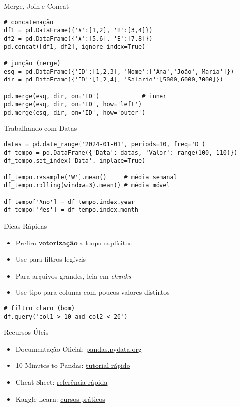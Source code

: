 \documentclass[aspectratio=169]{beamer}
\let\texttt\textttblue
\begin{document}
\begin{frame}[fragile]{Merge, Join e Concat}
\begin{lstlisting}
# concatenação
df1 = pd.DataFrame({'A':[1,2], 'B':[3,4]})
df2 = pd.DataFrame({'A':[5,6], 'B':[7,8]})
pd.concat([df1, df2], ignore_index=True)

# junção (merge)
esq = pd.DataFrame({'ID':[1,2,3], 'Nome':['Ana','João','Maria']})
dir = pd.DataFrame({'ID':[1,2,4], 'Salario':[5000,6000,7000]})

pd.merge(esq, dir, on='ID')            # inner
pd.merge(esq, dir, on='ID', how='left')
pd.merge(esq, dir, on='ID', how='outer')
\end{lstlisting}
\end{frame}

\begin{frame}[fragile]{Trabalhando com Datas}
\begin{lstlisting}
datas = pd.date_range('2024-01-01', periods=10, freq='D')
df_tempo = pd.DataFrame({'Data': datas, 'Valor': range(100, 110)})
df_tempo.set_index('Data', inplace=True)

df_tempo.resample('W').mean()     # média semanal
df_tempo.rolling(window=3).mean() # média móvel

df_tempo['Ano'] = df_tempo.index.year
df_tempo['Mes'] = df_tempo.index.month
\end{lstlisting}
\end{frame}

\begin{frame}[fragile]{Dicas Rápidas}
  \begin{itemize}
    \item Prefira \textbf{vetorização} a loops explícitos
    \item Use \texttt{query()} para filtros legíveis
    \item Para arquivos grandes, leia em \textit{chunks}
    \item Use tipo \texttt{category} para colunas com poucos valores distintos
  \end{itemize}
\vspace{0.4em}
\begin{lstlisting}
# filtro claro (bom)
df.query('col1 > 10 and col2 < 20')
\end{lstlisting}
\end{frame}

\begin{frame}{Recursos Úteis}
  \small
  \begin{itemize}
    \item Documentação Oficial: \href{https://pandas.pydata.org}{pandas.pydata.org}
    \item 10 Minutes to Pandas: \href{https://pandas.pydata.org/pandas-docs/stable/user_guide/10min.html}{tutorial rápido}
    \item Cheat Sheet: \href{https://pandas.pydata.org/Pandas_Cheat_Sheet.pdf}{referência rápida}
    \item Kaggle Learn: \href{https://www.kaggle.com/learn/pandas}{cursos práticos}
  \end{itemize}
\end{frame}
\end{document}
